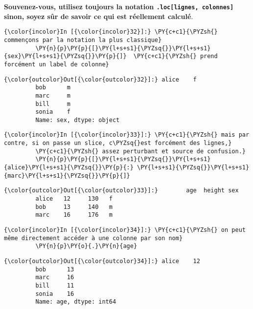 \textbf{Souvenez-vous, utilisez toujours la notation
\texttt{.loc{[}lignes,\ colonnes{]}} sinon, soyez sûr de savoir ce qui
est réellement calculé}.

    \begin{Verbatim}[commandchars=\\\{\}]
{\color{incolor}In [{\color{incolor}32}]:} \PY{c+c1}{\PYZsh{} commençons par la notation la plus classique}
         \PY{n}{p}\PY{p}{[}\PY{l+s+s1}{\PYZsq{}}\PY{l+s+s1}{sex}\PY{l+s+s1}{\PYZsq{}}\PY{p}{]}  \PY{c+c1}{\PYZsh{} prend forcément un label de colonne}
\end{Verbatim}


\begin{Verbatim}[commandchars=\\\{\}]
{\color{outcolor}Out[{\color{outcolor}32}]:} alice    f
         bob      m
         marc     m
         bill     m
         sonia    f
         Name: sex, dtype: object
\end{Verbatim}
            
    \begin{Verbatim}[commandchars=\\\{\}]
{\color{incolor}In [{\color{incolor}33}]:} \PY{c+c1}{\PYZsh{} mais par contre, si on passe un slice, c\PYZsq{}est forcément des lignes,}
         \PY{c+c1}{\PYZsh{} assez perturbant et source de confusion.}
         \PY{n}{p}\PY{p}{[}\PY{l+s+s1}{\PYZsq{}}\PY{l+s+s1}{alice}\PY{l+s+s1}{\PYZsq{}}\PY{p}{:} \PY{l+s+s1}{\PYZsq{}}\PY{l+s+s1}{marc}\PY{l+s+s1}{\PYZsq{}}\PY{p}{]}
\end{Verbatim}


\begin{Verbatim}[commandchars=\\\{\}]
{\color{outcolor}Out[{\color{outcolor}33}]:}        age  height sex
         alice   12     130   f
         bob     13     140   m
         marc    16     176   m
\end{Verbatim}
            
    \begin{Verbatim}[commandchars=\\\{\}]
{\color{incolor}In [{\color{incolor}34}]:} \PY{c+c1}{\PYZsh{} on peut même directement accéder à une colonne par son nom}
         \PY{n}{p}\PY{o}{.}\PY{n}{age}
\end{Verbatim}


\begin{Verbatim}[commandchars=\\\{\}]
{\color{outcolor}Out[{\color{outcolor}34}]:} alice    12
         bob      13
         marc     16
         bill     11
         sonia    16
         Name: age, dtype: int64
\end{Verbatim}
            
